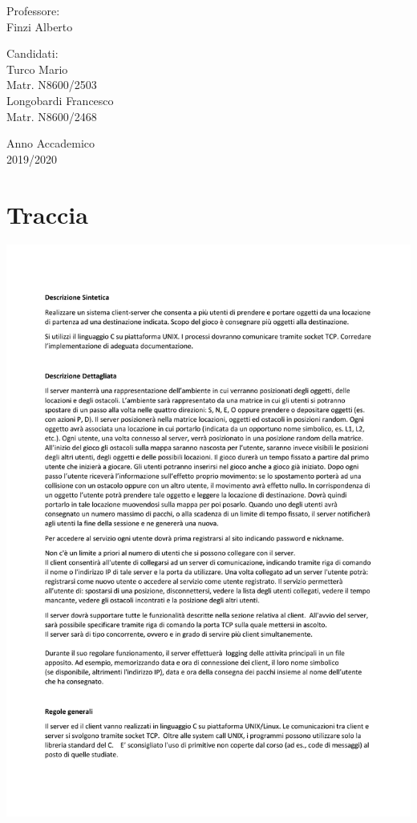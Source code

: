 \documentclass[a4paper]{article}
\begin{document}
\begin{titlepage}
\begin{center}
  \vfill
  
  \begin{multicols}{2}
    {\large Professore:\\}
    Finzi Alberto\
    \vspace{5mm}
    
    
      \vspace{5mm}
    
    {\large Candidati:\\}
    Turco Mario\\
    Matr. N8600/2503\\
    Longobardi Francesco\\
    Matr. N8600/2468\\
    \vspace{10mm}
  \end{multicols}
  
  \vfill
  
  {\large Anno Accademico\\ 2019/2020}
  
  \end{center}
  

\end{titlepage}
\clearpage\null\newpage
\tableofcontents
\clearpage\null\newpage
{}
\section{Traccia} 
\includegraphics[width=\textwidth]{traccia.pdf}
\pagebreak
\end{document}
